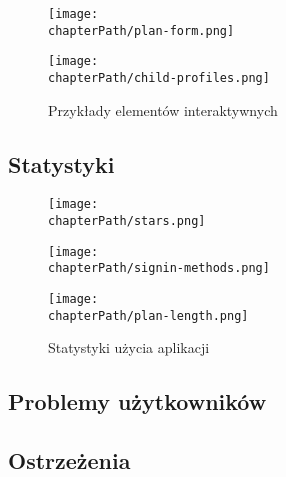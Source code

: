 \bigskip
\begin{figure}[H]
\centering
\begin{minipage}{.3\textwidth}
	\centering
	\texttt{[image: \\chapterPath/plan-form.png]}
\end{minipage}
\begin{minipage}{.4\textwidth}
	\centering
	\texttt{[image: \\chapterPath/child-profiles.png]}
\end{minipage}
\bigskip
\caption{Przykłady elementów interaktywnych}
\label{fig:interactive_areas}
\end{figure}

\subsection{Statystyki}

\bigskip
\begin{figure}[H]
\centering
\begin{minipage}{.3\textwidth}
	\centering
	\texttt{[image: \\chapterPath/stars.png]}
\end{minipage}
\begin{minipage}{.3\textwidth}
	\centering
	\texttt{[image: \\chapterPath/signin-methods.png]}
\end{minipage}
\begin{minipage}{.35\textwidth}
	\centering
	\texttt{[image: \\chapterPath/plan-length.png]}
\end{minipage}
\bigskip
\caption{Statystyki użycia aplikacji}
\label{fig:statistics}
\end{figure}

\bigskip
{}

\subsection{Problemy użytkowników}

\bigskip
{}

\subsection{Ostrzeżenia}

\bigskip
{}

